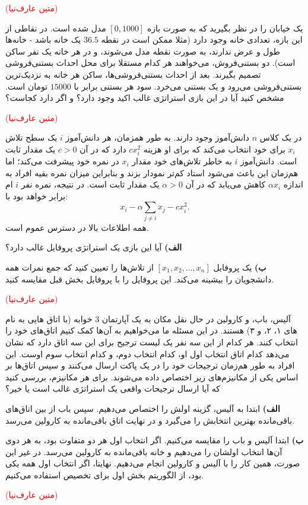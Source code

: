 \documentclass[11pt,a4paper]{article}
\begin{document}
\vspace{0.5em}
\textcolor{red}{(متین عارف‌نیا)}


یک خیابان را در نظر بگیرید که به صورت بازه $[0,1000]$ مدل شده است. در نقاطی از این بازه، تعدادی خانه وجود دارد (مثلا ممکن است در نقطه $36.5$ یک خانه باشد - خانه‌ها طول و عرض ندارند، به صورت نقطه مدل می‌شوند، و در هر خانه یک نفر ساکن است). دو بستنی‌فروش، می‌خواهند هر کدام مستقلا برای محل احداث بستنی‌فروشی تصمیم بگیرند. بعد از احداث بستنی‌فروشی‌ها، ساکن هر خانه به نزدیک‌ترین بستنی‌فروشی می‌رود و یک بستنی می‌خرد. سود هر بستنی  برابر با $15000$ تومان است. مشخص کنید آیا در این بازی استراتژی غالب اکید وجود دارد؟ و اگر دارد کجاست؟

\vspace{0.5em}
\textcolor{red}{(متین عارف‌نیا)}



در یک کلاس $n$ دانش‌آموز وجود دارند.  به طور همزمان، هر دانش‌آموز $i$ یک سطح تلاش $x_i$ برای خود انتخاب می‌کند که برای او هزینه $cx_i^2$ دارد که در آن $c>0$ یک مقدار ثابت است. دانش‌آموز $i$ به خاطر تلاش‌های خود مقدار $x_i$ در نمره خود پیشرفت می‌کند؛	اما هم‌زمان این باعث می‌شود استاد کم‌تر نمودار بزند و بنابراین میزان نمره بقیه افراد به اندازه $\alpha x_i$ کاهش می‌یابد که در آن $\alpha>0$ یک مقدار ثابت است. در نتیجه، نمره نفر $i$ ام برابر خواهد بود با:
$$
x_i - \alpha \sum_{j \neq i}x_j - cx_i^2.
$$
همه اطلاعات بالا در دسترس عموم است.

	\textbf{الف)} 
	آیا این بازی یک استراتژی پروفایل غالب دارد؟
	
	
	\textbf{ب)} 
یک پروفایل $[x_1,x_2,\ldots,x_n]$ از تلاش‌ها را تعیین کنید که جمع نمرات همه دانشجویان را بیشینه می‌کند. این پروفایل را با پروفایل بخش قبل مقایسه کنید. 

\vspace{0.5em}
\textcolor{red}{(متین عارف‌نیا)}


آلیس، باب، و کارولین در حال نقل مکان به یک آپارتمان 3 خوابه (با اتاق هایی به نام های ۱، ۲، و ۳) هستند. در این مسئله ما می‌خواهیم به آن‌ها کمک کنیم اتاق‌های خود را انتخاب کنند. هر کدام از این سه نفر یک لیست ترجیح برای این سه اتاق دارد که نشان می‌دهد کدام اتاق انتخاب اول او، کدام انتخاب دوم، و کدام انتخاب سوم اوست.
این افراد به طور هم‌زمان ترجیحات خود را در یک پاکت ارسال می‌کنند و سپس اتاق‌‌ها بر اساس یکی از مکانیزم‌های زیر اختصاص داده می‌شوند. برای هر مکانیزم، بررسی کنید که آیا ارسال ترجیحات واقعی یک استراتژی غالب است یا خیر؟

 	\textbf{الف)} 
 	ابتدا به آلیس، گزینه اولش را اختصاص می‌دهیم. سپس باب از بین اتاق‌های باقی‌مانده بهترین انتخابش را می‌گیرد و در نهایت اتاق باقی‌مانده به کارولین می‌رسد.
 	

	 	\textbf{ب)}
	 	ابتدا آلیس و باب را مقایسه می‌کنیم. اگر انتخاب اول هر دو متفاوت بود، به هر دوی آن‌ها انتخاب اولشان را می‌دهیم و خانه باقی‌مانده به کارولین می‌رسد. در غیر این صورت، همین کار را با آلیس و کارولین انجام می‌دهیم. نهایتا، اگر انتخاب اول همه یکی بود، از الگوریتم بخش اول برای تخصیص استفاده می‌کنیم.

\vspace{0.5em}
\textcolor{red}{(متین عارف‌نیا)}
\end{document}
